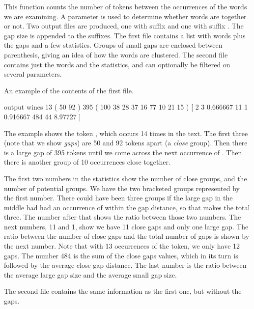 \documentclass[a4paper,10pt,twoside]{report}
\begin{document}
This function counts the number of tokens between the occurrences of
the words we are examining. A  parameter is used to determine
whether words are  together or not. Two output files are
produced, one with suffix  and one with suffix . The
gap size is appended to the suffixes. The first file contains a list
with words plus the gaps and a few statistics. Groups of small gaps
are enclosed between parenthesis, giving an idea of how the words are
clustered. The second file contains just the words and the statistics,
and can optionally be filtered on several parameters.

An example of the contents of the first file.

\begin{wout}{ output}
wines 13 ( 50 92 ) 395 ( 100 38 28 37 16 77 10 21 15 )
                            [ 2 3 0.666667 11 1 0.916667 484 44 8.97727 ]
\end{wout}

The example shows the token , which occurs \num{14} times
in the text. The first three (note that we show \emph{gaps}) are
\num{50} and \num{92} tokens apart (a \emph{close} group). Then there
is a large gap of \num{395} tokens until we come across the next
occurrence of . Then there is another group of \num{10}
occurrences close together.

The first two numbers in the statistics show the number of close
groups, and the number of potential groups. We have the two bracketed
groups represented by the first number. There could have been three
groups if the large gap in the middle had had an occurrence of
 within the gap distance, so that makes the total
three. The number after that shows the ratio between those two
numbers. The next numbers, \num{11} and \num{1}, show we have \num{11}
close gaps and only one large gap. The ratio between the number of
close gaps and the total number of gaps is shown by the next
number. Note that with \num{13} occurrences of the token, we only have
\num{12} gaps. The number \num{484} is the sum of the close gaps
values, which in its turn is followed by the average close gap
distance. The last number is the ratio between the average large gap
size and the average small gap size.

The second file contains the same information as the first one, but
without the gaps.
\end{document}
